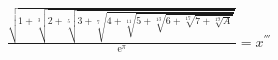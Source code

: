 \documentclass[12pt]{article}
\begin{document}
${ \displaystyle
   \frac{\sqrt{1 + \sqrt[3]{2 + \sqrt[5]{3 + \sqrt[7]{4 + \sqrt[11]{5 + \sqrt[13]{6 + \sqrt[17]{7 + \sqrt[19]{A}}}}}}}}}{\mathrm{e}^\pi} = x^{'''}
}$
\end{document}

